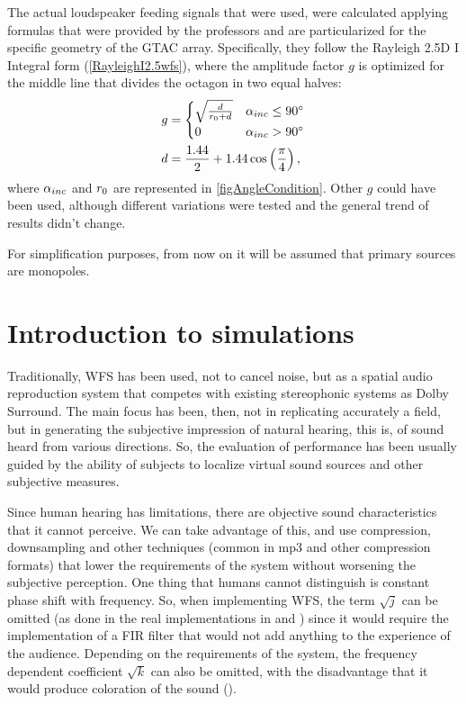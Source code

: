 The actual loudspeaker feeding signals that were used, were calculated applying formulas that were provided by the professors and are particularized for the specific geometry of the GTAC array. Specifically, they follow the Rayleigh 2.5D I Integral form (\autoref{RayleighI2.5wfs}), where the amplitude factor $g$ is optimized for the middle line that divides the octagon in two equal halves:
\begin{equation}
\begin{aligned}
g &= 
\begin{cases}
\sqrt{\frac{d}{r_0 + d}} & \alpha_{inc} \leq 90^\circ \\
0 & \alpha_{inc} > 90^\circ
\end{cases}
\\
d &= \frac{1.44}{2} + 1.44 \cos\left( \frac{\pi}{4} \right),
\end{aligned}
\label{amplitFactorGTAC}
\end{equation}
where $\alpha_{inc}$ and $r_0$ are represented in
\autoref{figAngleCondition}. Other $g$ could have been used, although different variations were tested and the general trend of results didn't change.

For simplification purposes, from now on it will be assumed that primary sources are monopoles.

\section{Introduction to simulations}
Traditionally, WFS has been used, not to cancel noise, but as a spatial audio reproduction system that competes with existing stereophonic systems as Dolby Surround. The main focus has been, then, not in replicating accurately a field, but in generating the subjective impression of natural hearing, this is, of sound heard from various directions. So, the evaluation of performance has been usually guided by the ability of subjects to localize virtual sound sources and other subjective measures.

Since human hearing has limitations, there are objective sound characteristics that it cannot perceive. We can take advantage of this, and use compression, downsampling and other techniques (common in mp3 and other compression formats) that lower the requirements of the system without worsening the subjective perception. One thing that humans cannot distinguish is constant phase shift with frequency. So, when implementing WFS, the term $\sqrt{j}$ can be omitted (as done in the real implementations in \cite{Verheijen} and \cite{Vogel}) since it would require the implementation of a FIR filter that would not add anything to the experience of the audience. Depending on the requirements of the system, the frequency dependent coefficient $\sqrt{k}$ can also be omitted, with the disadvantage that it would produce coloration of the sound (\cite{Vogel}).

